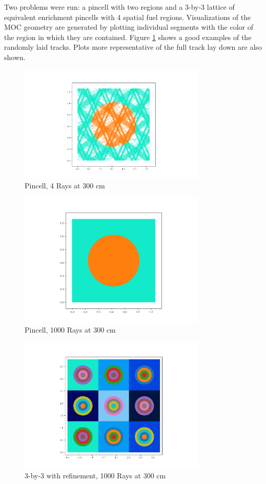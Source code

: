 \documentclass[10pt,letter]{article}
\begin{document}
Two problems were run: a pincell with two regions and a 3-by-3 lattice of equivalent enrichment pincells with 4 spatial fuel regions. Visualizations of the MOC geometry are generated by plotting individual segments with the color of the region in which they are contained. Figure \ref{fig:random} shows a good examples of the randomly laid tracks. Plots more representative of the full track lay down are also shown. 

\begin{figure}[H]
    \centering
    \includegraphics[width=0.8\textwidth]{figs/random_ray.png}
    \caption{Pincell, 4 Rays at 300 cm}
    \label{fig:random}
\end{figure}
\begin{figure}[H]
    \centering
    \includegraphics[width=0.8\textwidth]{figs/pincell_geometry.png}
    \caption{Pincell, 1000 Rays at 300 cm}
    \label{fig:5}
\end{figure}
\begin{figure}[H]
    \centering
    \includegraphics[width=0.8\textwidth]{figs/3by3_geometry.png}
    \caption{3-by-3 with refinement, 1000 Rays at 300 cm}
    \label{fig:5}
\end{figure}
\end{document}
